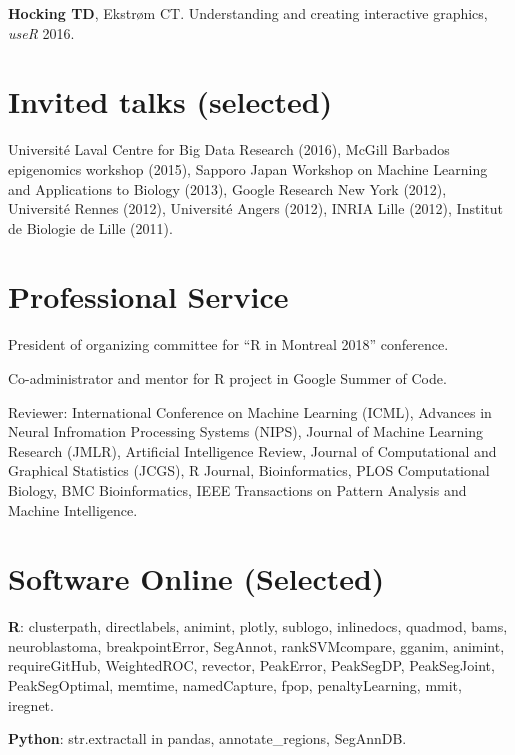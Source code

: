 \documentclass[margin,line]{res}
\begin{document}
\begin{resume}
{\bf Hocking TD}, Ekstr\o m CT. Understanding and creating interactive
graphics, {\it useR} 2016.

\section{\sc Invited talks (selected)}

Universit\'e Laval Centre for Big Data Research (2016), McGill
Barbados epigenomics workshop (2015), Sapporo Japan Workshop on
Machine Learning and Applications to Biology (2013), Google Research
New York (2012), Universit\'e Rennes (2012), Universit\'e Angers
(2012), INRIA Lille (2012), Institut de Biologie de Lille (2011).

\section{\sc Professional Service}

President of organizing committee for ``R in Montreal 2018'' conference.

Co-administrator and mentor for R project in Google Summer of Code.

Reviewer: International Conference on Machine Learning (ICML),
Advances in Neural Infromation Processing Systems (NIPS), Journal of
Machine Learning Research (JMLR), Artificial Intelligence Review,
Journal of Computational and Graphical Statistics (JCGS), R Journal,
Bioinformatics, PLOS Computational Biology, BMC Bioinformatics, IEEE
Transactions on Pattern Analysis and Machine Intelligence.

\section{\sc Software Online (Selected)} 

{\bf R}: clusterpath, directlabels, animint, plotly, sublogo,
inlinedocs, quadmod, bams, neuroblastoma, breakpointError, SegAnnot,
rankSVMcompare, gganim, animint, requireGitHub, WeightedROC, revector,
PeakError, PeakSegDP, PeakSegJoint, PeakSegOptimal, memtime,
namedCapture, fpop, \mbox{penaltyLearning}, mmit, iregnet.

{\bf Python}: str.extractall in pandas, annotate\_regions, SegAnnDB.

\begin{comment}
\pagebreak

\section{\sc References}


\end{comment}
\end{resume}
\end{document}

